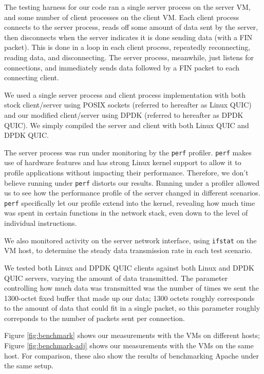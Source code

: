 \documentclass{sig-alternate-05-2015}
\begin{document}
The testing harness for our code ran a single server process on the server VM,
and some number of client processes on the client VM.
Each client process connects to the server process,
reads off some amount of data sent by the server,
then disconnects when the server indicates it is done sending data (with a FIN packet).
This is done in a loop in each client process, repeatedly reconnecting, reading data, and disconnecting.
The server process, meanwhile, just listens for connections,
and immediately sends data followed by a FIN packet to each connecting client.

We used a single server process and client process implementation with both 
stock client/server using POSIX sockets
(referred to hereafter as Linux QUIC)
and our modified client/server using DPDK
(referred to hereafter as DPDK QUIC).
We simply compiled the server and client with both Linux QUIC and DPDK QUIC.

The server process was run under monitoring by the \texttt{perf} profiler.
\texttt{perf} makes use of hardware features and has strong Linux kernel support
to allow it to profile applications without impacting their performance.
Therefore, we don't believe running under \texttt{perf} distorts our results.
Running under a profiler allowed us to see how the performance profile of the server changed in different scenarios.
\texttt{perf} specifically let our profile extend into the kernel,
revealing how much time was spent in certain functions in the network stack,
even down to the level of individual instructions.

We also monitored activity on the server network interface,
using \texttt{ifstat} on the VM host,
to determine the steady data transmission rate in each test scenario.

We tested both Linux and DPDK QUIC clients against both Linux and DPDK QUIC servers,
varying the amount of data transmitted.
The parameter controlling how much data was transmitted was the number of times we sent the 1300-octet fixed buffer that made up our data;
1300 octets roughly corresponds to the amount of data that could fit in a single packet,
so this parameter roughly correponds to the number of packets sent per connection.

Figure \ref{fig:benchmark} shows our measurements with the VMs on different hosts;
Figure \ref{fig:benchmark-adj} shows our measurements with the VMs on the same host.
For comparison, these also show the results of benchmarking Apache under the same setup.
\end{document}
